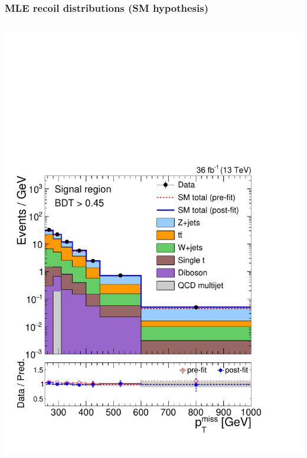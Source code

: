 \documentclass[aspectratio=169,xcolor=dvipsnames,,table,compress]{beamer}
\begin{document}
\begin{frame}[t] \frametitle{MLE recoil distributions (SM hypothesis)}
  \vspace{-7mm}
  \begin{columns}[T]
    \begin{column}{0.25\textwidth}
      \centering
      \vspace{-3.5mm}
      \includegraphics[width=\textwidth]{../figures/monotop/postfit/stackedPostfit_signal_monotop.pdf}\\
      \vspace{-5.5mm}

\end{column}
\end{columns}
\end{frame}
\end{document}

